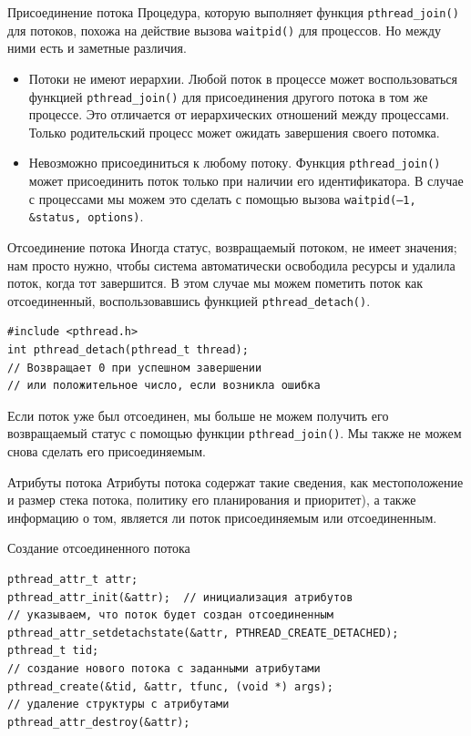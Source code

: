\documentclass{beamer}
\begin{document}
\begin{frame}{Присоединение потока}
    Процедура, которую выполняет функция \texttt{pthread\_join()} для потоков, похожа на действие вызова \texttt{waitpid()} для процессов. Но между ними есть и заметные различия.
    \begin{itemize}
        \item Потоки не имеют иерархии. Любой поток в процессе может воспользоваться функцией \texttt{pthread\_join()} для присоединения другого потока в том же процессе. Это отличается от иерархических отношений между процессами. Только родительский процесс может ожидать завершения своего потомка.
        \item Невозможно присоединиться к любому потоку. Функция \texttt{pthread\_join()} может присоединить поток только при наличии его идентификатора. В случае с процессами мы можем это сделать с помощью вызова \texttt{waitpid(–1, &status, options)}.
    \end{itemize}
\end{frame}

\begin{frame}[fragile]{Отсоединение потока}
    Иногда статус, возвращаемый потоком, не имеет значения; нам просто нужно, чтобы система автоматически освободила ресурсы и удалила поток, когда тот завершится. В этом случае мы можем пометить поток как отсоединенный, воспользовавшись функцией \texttt{pthread\_detach()}.
    
\begin{verbatim}
#include <pthread.h>
int pthread_detach(pthread_t thread);
// Возвращает 0 при успешном завершении 
// или положительное число, если возникла ошибка
\end{verbatim}
    
    Если поток уже был отсоединен, мы больше не можем получить его возвращаемый статус с помощью функции \texttt{pthread\_join()}. Мы также не можем снова сделать его присоединяемым.
\end{frame}

\begin{frame}[fragile]{Атрибуты потока}
    Атрибуты потока содержат такие сведения, как местоположение и размер стека потока, политику его планирования и приоритет), а также информацию о том, является ли поток присоединяемым или отсоединенным.
    
    Создание отсоединенного потока

\begin{verbatim}
pthread_attr_t attr;
pthread_attr_init(&attr);  // инициализация атрибутов
// указываем, что поток будет создан отсоединенным
pthread_attr_setdetachstate(&attr, PTHREAD_CREATE_DETACHED);
pthread_t tid;
// создание нового потока с заданными атрибутами
pthread_create(&tid, &attr, tfunc, (void *) args);
// удаление структуры с атрибутами
pthread_attr_destroy(&attr);
\end{verbatim}
\end{frame}
\end{document}
